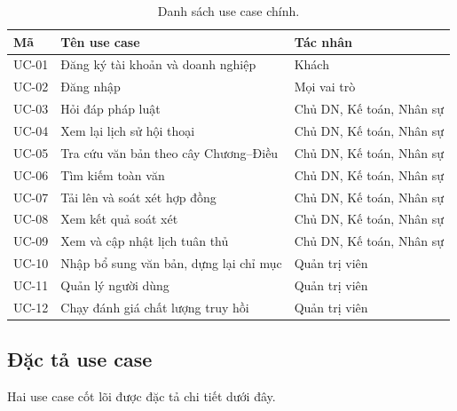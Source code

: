 \documentclass[12pt,a4paper]{report}
\numberwithin{equation}{chapter}
\numberwithin{figure}{chapter}
\numberwithin{table}{chapter}
\begin{document}
\begin{table}[htp]
    \centering
    \caption{Danh sách use case chính.}
    \label{tab:danh-sach-uc}
    \begin{tabular}{p{1.6cm}p{5.4cm}p{6.6cm}}
        \toprule
        \textbf{Mã} & \textbf{Tên use case} & \textbf{Tác nhân} \\
        \midrule
        UC-01 & Đăng ký tài khoản và doanh nghiệp & Khách \\
        UC-02 & Đăng nhập & Mọi vai trò \\
        UC-03 & Hỏi đáp pháp luật & Chủ DN, Kế toán, Nhân sự \\
        UC-04 & Xem lại lịch sử hội thoại & Chủ DN, Kế toán, Nhân sự \\
        UC-05 & Tra cứu văn bản theo cây Chương--Điều & Chủ DN, Kế toán, Nhân sự \\
        UC-06 & Tìm kiếm toàn văn & Chủ DN, Kế toán, Nhân sự \\
        UC-07 & Tải lên và soát xét hợp đồng & Chủ DN, Kế toán, Nhân sự \\
        UC-08 & Xem kết quả soát xét & Chủ DN, Kế toán, Nhân sự \\
        UC-09 & Xem và cập nhật lịch tuân thủ & Chủ DN, Kế toán, Nhân sự \\
        UC-10 & Nhập bổ sung văn bản, dựng lại chỉ mục & Quản trị viên \\
        UC-11 & Quản lý người dùng & Quản trị viên \\
        UC-12 & Chạy đánh giá chất lượng truy hồi & Quản trị viên \\
        \bottomrule
    \end{tabular}
\end{table}

\subsection{Đặc tả use case}

Hai use case cốt lõi được đặc tả chi tiết dưới đây.
\end{document}

